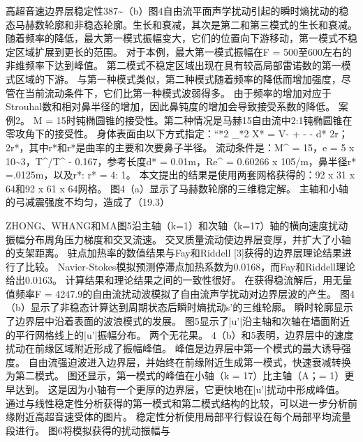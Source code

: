 \documentclass[UTF8,11pt,a4paper,openany,fontset=fandol]{ctexbook}
\begin{document}
高超音速边界层稳定性387\textasciitilde{}（b）图4自由流平面声学扰动引起的瞬时熵扰动的稳态马赫数轮廓和非稳态轮廓。生长和衰减，其次是第二和第三模式的生长和衰减。 随着频率的降低，最大第一模式振幅变大，它们的位置向下游移动，第一模式不稳定区域扩展到更长的范围。 对于本例，最大第一模式振幅在F = 500至600左右的非维频率下达到峰值。 第二模式不稳定区域出现在具有较高局部雷诺数的第一模式区域的下游。 与第一种模式类似，第二种模式随着频率的降低而增加强度，尽管在当前流动条件下，它们比第一种模式波弱得多。 由于频率的增加对应于Strouhal数和相对鼻半径的增加，因此鼻钝度的增加会导致接受系数的降低。 案例2。 M = 15时钝椭圆锥的接受性。第二种情况是马赫15自由流中2:1钝椭圆锥在零攻角下的接受性。 身体表面由以下方式指定：“*2 \_*2 X* = V- + - - d* 2r；2r*，其中r*和r*是曲率的主要和次要鼻子半径。 流动条件是：M\textasciicircum{} = 15，e = 5 x 10\textasciitilde{}3，T\textasciicircum{}/T\textasciicircum{} - 0.167，参考长度d* = 0.01m，Re\textasciicircum{} = 0.60266 x 105/m，鼻半径r* =.0125m，以及r*: r* = 4: 1。 本文提出的结果是使用两套网格获得的：92 x 31 x 64和92 x 61 x 64网格。 图4（a）显示了马赫数轮廓的三维稳定解。 主轴和小轴的弓减震强度不均匀，造成了（19.3）

ZHONG、WHANG和MA图5沿主轴（k=1）和次轴（k=17）轴的横向速度扰动振幅分布周角压力梯度和交叉流速。 交叉质量流动使边界层变厚，并扩大了小轴的支架距离。 驻点加热率的数值结果与Fay和Riddell [3]获得的边界层理论结果进行了比较。 Navier-Stokes模拟预测停滞点加热系数为0.0168，而Fay和Riddell理论给出0.0163。 计算结果和理论结果之间的一致性很好。 在获得稳流解后，用无量值频率F = 4247.9的自由流扰动波模拟了自由流声学扰动对边界层波的产生。 图4（b）显示了非稳态计算达到周期状态后瞬时熵扰动s'的三维轮廓。 瞬时轮廓显示了边界层中沿着表面的波浪模式的发展。 图5显示了|u'|沿主轴和次轴在墙面附近的平行网格线上的|u'|振幅分布。 两个无花果。 4（b）和5表明，边界层中的速度扰动在前缘区域附近形成了振幅峰值。 峰值是边界层中第一个模式的最大诱导强度。 自由流强迫波进入边界层，并始终在前缘附近生成第一模式，快速衰减转换为第二模式。 图还显示，第一模式的峰值在小轴（k = 17）比主轴（A；= 1）更早达到。 这是因为小轴有一个更厚的边界层，它更快地在|u'|扰动中形成峰值。 通过与线性稳定性分析获得的第一模式和第二模式结构的比较，可以进一步分析前缘附近高超音速受体的图片。 稳定性分析使用局部平行假设在每个局部平均流量段进行。 图6将模拟获得的扰动振幅与
\end{document}
